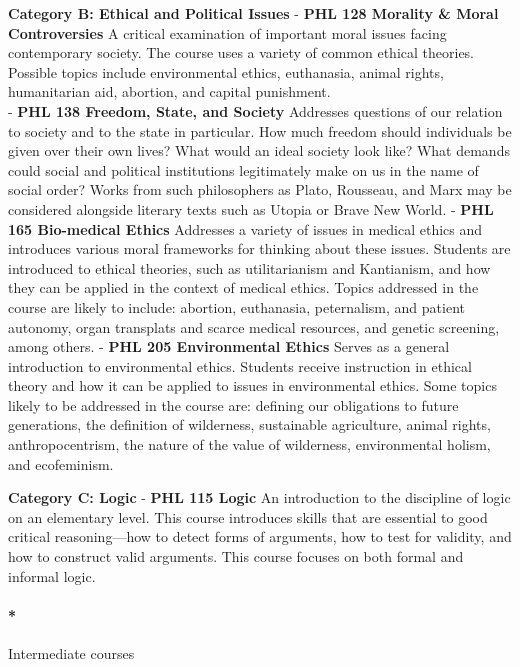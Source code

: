\documentclass[
  letterpaper,
]{scrbook}
\let\oldparagraph\paragraph
\renewcommand{\paragraph}[1]{\oldparagraph{#1}\mbox{}}
\begin{document}
\textbf{Category B: Ethical and Political Issues} - \textbf{PHL 128
Morality \& Moral Controversies} A critical examination of important
moral issues facing contemporary society. The course uses a variety of
common ethical theories. Possible topics include environmental ethics,
euthanasia, animal rights, humanitarian aid, abortion, and capital
punishment.\\
- \textbf{PHL 138 Freedom, State, and Society} Addresses questions of
our relation to society and to the state in particular. How much freedom
should individuals be given over their own lives? What would an ideal
society look like? What demands could social and political institutions
legitimately make on us in the name of social order? Works from such
philosophers as Plato, Rousseau, and Marx may be considered alongside
literary texts such as Utopia or Brave New World. - \textbf{PHL 165
Bio-medical Ethics} Addresses a variety of issues in medical ethics and
introduces various moral frameworks for thinking about these issues.
Students are introduced to ethical theories, such as utilitarianism and
Kantianism, and how they can be applied in the context of medical
ethics. Topics addressed in the course are likely to include: abortion,
euthanasia, peternalism, and patient autonomy, organ transplats and
scarce medical resources, and genetic screening, among others. -
\textbf{PHL 205 Environmental Ethics} Serves as a general introduction
to environmental ethics. Students receive instruction in ethical theory
and how it can be applied to issues in environmental ethics. Some topics
likely to be addressed in the course are: defining our obligations to
future generations, the definition of wilderness, sustainable
agriculture, animal rights, anthropocentrism, the nature of the value of
wilderness, environmental holism, and ecofeminism.

\textbf{Category C: Logic} - \textbf{PHL 115 Logic} An introduction to
the discipline of logic on an elementary level. This course introduces
skills that are essential to good critical reasoning---how to detect
forms of arguments, how to test for validity, and how to construct valid
arguments. This course focuses on both formal and informal logic.

\paragraph*{Intermediate courses}\label{intermediate-courses}
\end{document}
